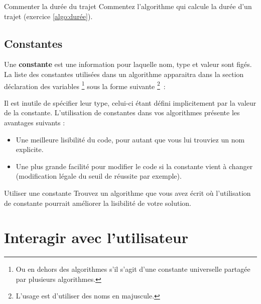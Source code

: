 			\begin{Exercice}{Commenter la durée du trajet}
				Commentez l'algorithme qui calcule la durée d'un trajet
				(exercice \vref{algo:durée}).
			\end{Exercice}
			
		\subsection{Constantes}
	
			Une \textbf{constante} est une information pour laquelle nom, type et
			valeur sont figés. La liste des constantes utilisées dans un algorithme
			apparaitra dans la section déclaration des variables%
			\footnote{%
				Ou en dehors des algorithmes s'il s'agit d'une
				constante universelle partagée par plusieurs algorithmes.%
			} 
			sous la forme suivante%
			\footnote{%
				L'usage est d'utiliser des noms en majuscule.%
			}~:
	
			\begin{LDA}
			\end{LDA}
	
			Il est inutile de spécifier leur type, celui-ci
			étant défini implicitement par la valeur de la constante.	
			L'utilisation de constantes dans vos algorithmes présente
			les avantages suivants :
			\begin{itemize}
			\item
				Une meilleure lisibilité du code,
				pour autant que vous lui trouviez un nom explicite.
			\item
				Une plus grande facilité pour modifier le code
				si la constante vient à changer 
				(modification légale du seuil de réussite par exemple).
			\end{itemize}
			
			\begin{Exercice}{Utiliser une constante}
				Trouvez un algorithme que vous avez écrit
				où l'utilisation de constante
				pourrait améliorer la lisibilité de votre solution.
			\end{Exercice}
			
	\section{Interagir avec l'utilisateur}
	
